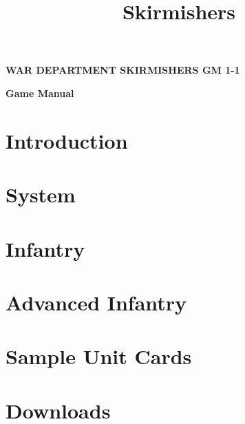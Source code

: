 \documentclass{article}
\title{Skirmishers}
\author{}
\date{}
\newcommand{\mysectiontitle}{}
\newcommand{\newsection}[2]{\renewcommand{\mysectiontitle}{#2}\section{#1}}
\begin{document}
\makeatletter
{}

\begin{center}
  \fontsize{30}{37}\bfseries\selectfont\MakeUppercase{War Department}
  \fontsize{50}{60}\bfseries\selectfont\MakeUppercase{Skirmishers}
  \fontsize{30}{37}\bfseries\selectfont\MakeUppercase{GM 1-1}

  \LARGE\bfseries{Game Manual}
\end{center}

\newsection{Introduction}{introduction}



\newpage

\newsection{System}{system}



\newpage

\newsection{Infantry}{infantry}



\newpage

\newsection{Advanced Infantry}{advanced-infantry}



\newpage

\newsection{Sample Unit Cards}{sample-unit-cards}



\newpage

\newsection{Downloads}{downloads}
\label{sec:downloads}



\newpage
\end{document}
